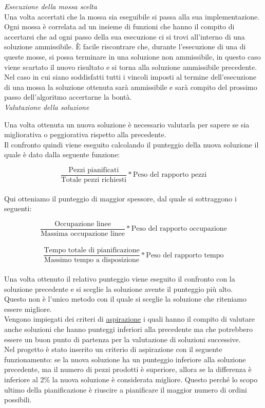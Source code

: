 \textit{Esecuzione della mossa scelta}\\
Una volta accertati che la mossa sia eseguibile si passa alla sua implementazione.\\ Ogni mossa è correlata ad un insieme di funzioni che hanno il compito di accertarsi che ad
ogni passo della sua esecuzione ci si trovi all'interno di una soluzione ammissibile. È facile riscontrare che, durante l'esecuzione di una di queste mosse, si possa terminare 
in una soluzione non ammissibile, in questo caso viene scartato il nuovo risultato e si torna alla soluzione ammissibile precedente.\\ Nel caso in cui siano soddisfatti tutti
i vincoli imposti al termine dell'esecuzione di una mossa la soluzione ottenuta sarà ammissibile e sarà compito del prossimo passo dell'algoritmo accertarne la bontà.\\

\textit{Valutazione della soluzione}

Una volta ottenuta un nuova soluzione è necessario valutarla per sapere se sia migliorativa o peggiorativa rispetto alla precedente.\\
Il confronto quindi viene eseguito calcolando il punteggio della nuova soluzione il quale è dato dalla seguente funzione:

\[\frac{\text{Pezzi pianificati}}{\text{Totale pezzi richiesti}} * \text{Peso del rapporto pezzi}\]\\

Qui otteniamo il punteggio di maggior spessore, dal quale si sottraggono i seguenti:

\[\frac{\text{Occupazione linee}}{\text{Massima occupazione linee}} * \text{Peso del rapporto occupazione}\]\\

\[\frac{\text{Tempo totale di pianificazione}}{\text{Massimo tempo a disposizione}} * \text{Peso del rapporto tempo}\]\\

Una volta ottenuto il relativo punteggio viene eseguito il confronto con la soluzione precedente e si sceglie la soluzione avente il punteggio più alto.\\
Questo non è l'unico metodo con il quale si sceglie la soluzione che riteniamo essere migliore.\\ Vengono impiegati dei criteri di \hyperref[Criteri di aspirazione]{aspirazione\glo} i quali hanno il compito
di valutare anche soluzioni che hanno punteggi inferiori alla precedente ma che potrebbero essere un buon punto di partenza per la valutazione di soluzioni successive.\\
Nel progetto è stato inserito un criterio di aspirazione con il seguente funzionamento: se la nuova soluzione ha un punteggio inferiore alla soluzione precedente, ma il 
numero di pezzi prodotti è superiore, allora se la differenza è inferiore al 2\% la nuova soluzione è considerata migliore. Questo perché lo scopo ultimo della pianificazione
è riuscire a pianificare il maggior numero di ordini possibili.


